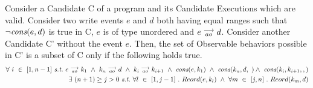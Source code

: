 \begin{corollary}
    Consider a Candidate C of a program and its Candidate Executions which are valid. Consider two write events $e$ and $d$ both having equal ranges such that $\neg \textit{cons}(e,d)$ is true in C, $e$ is of type unordered and $e\stackrel{\longrightarrow}{_{ao}}d$. 
    Consider another Candidate C' without the event $e$.  
    Then, the set of Observable behaviors possible in C' is a subset of C only if the following holds true.
    \begin{align*}
        \forall \ i \ \in \ [1,n-1] \ \textit{s.t.} \
        \reln{e}{ao}{k_1} \ \wedge \ \reln{k_n}{ao}{d} \ \wedge \ \reln{k_i}{ao}{k_{i+1}} \ \wedge \  
        \cons{e}{k_1} \ \wedge \ \cons{k_n, d} \ \wedge \ \cons{k_i, k_{i+1}}, \\
        \exists \ (n + 1) \geq j > 0 \ \textit{s.t.} \ 
        \forall l \ \in \ [1,j-1] \ . \ Reord(e, k_l) \ 
        \wedge \ 
        \forall m \ \in \ [j,n] \ . \ Reord(k_m, d) 
    \end{align*}
            
    
\end{corollary}

